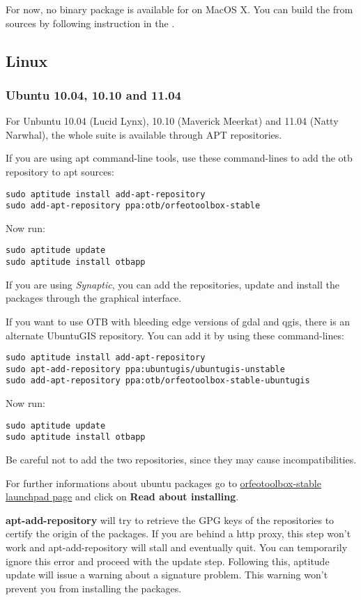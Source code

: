For now, no binary package is available for \app on MacOS X. You can
build the \app from sources by following instruction in the \sg.

\subsection{Linux}

\subsubsection{Ubuntu 10.04, 10.10 and 11.04}
\label{ssec:ubuntu_binaries}
For Unbuntu 10.04 (Lucid Lynx), 10.10 (Maverick Meerkat) and 11.04
(Natty Narwhal), the whole \otb suite is available through APT repositories.

If you are using apt command-line tools, use these command-lines to
add the otb repository to apt sources:
\begin{verbatim}
sudo aptitude install add-apt-repository 
sudo add-apt-repository ppa:otb/orfeotoolbox-stable
\end{verbatim}
Now run:
\begin{verbatim}
sudo aptitude update
sudo aptitude install otbapp
\end{verbatim}

If you are using \emph{Synaptic}, you can add the repositories, update
and install the packages through the graphical interface.

If you want to use OTB with bleeding edge versions of gdal and qgis,
there is an alternate UbuntuGIS repository.  You can add it by using
these command-lines:
\begin{verbatim}
sudo aptitude install add-apt-repository 
sudo apt-add-repository ppa:ubuntugis/ubuntugis-unstable
sudo add-apt-repository ppa:otb/orfeotoolbox-stable-ubuntugis
\end{verbatim}
Now run:
\begin{verbatim}
sudo aptitude update
sudo aptitude install otbapp
\end{verbatim}

Be careful not to add the two repositories, since they may cause
incompatibilities.

For further informations about ubuntu packages go to
\href{https://launchpad.net/~otb/+archive/orfeotoolbox-stable}{orfeotoolbox-stable
  launchpad page} and click on \textbf{Read about installing}.

\textbf{apt-add-repository} will try to retrieve the GPG keys of the
repositories to certify the origin of the packages. If you are behind
a http proxy, this step won't work and apt-add-repository will stall
and eventually quit. You can temporarily ignore this error and proceed
with the update step. Following this, aptitude update will issue a
warning about a signature problem. This warning won't prevent you from
installing the packages.


